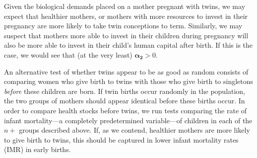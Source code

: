 \documentclass[subeqn]{article}
\begin{document}
\begin{spacing}{1.4}
Given the biological demands placed on a mother pregnant with twins, we may 
expect that healthier mothers, or mothers with more resources to invest in their
pregnancy are more likely to take twin conceptions to term.  Similarly, we may
suspect that mothers more able to invest in their children during pregnancy will 
also be more able to invest in their child's human capital after birth.  If this 
is the case, we would see that (at the very least) $\bm{\alpha_2}>0$.  

An alternative test of whether twins appear to be as good as random consists of 
comparing women who give birth to twins with those who give birth to singletons 
\emph{before} these children are born.  If twin births occur randomly in the 
population, the two groups of mothers should appear identical before these births 
occur. In order to compare health stocks before twins, we run tests comparing the 
rate of infant mortality---a completely predetermined variable---of children in 
each of the $n+$ groups described above.  If, as we contend, healthier mothers 
are more likely to give birth to twins, this should be captured in lower infant 
mortality rates (IMR) in early births.


\end{spacing}
\end{document}
